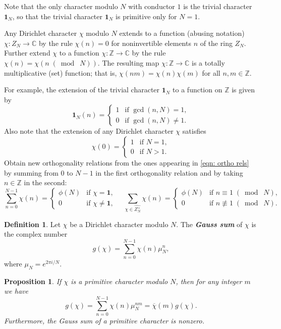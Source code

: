 \documentclass[10pt,leqno,twoside]{article}
\theoremstyle{plain}
\newtheorem{proposition}[lem]{Proposition}
\theoremstyle{definition}
\newtheorem{definition/}[lem]{Definition}
\newenvironment{definition}
  {\renewcommand{\qedsymbol}{\textdagger}%
   \pushQED{\qed}\begin{definition/}}
  {\popQED\end{definition/}}
\numberwithin{equation}{section}
\numberwithin{lem}{section}
\newcommand{\textib}[1]{\textbf{\textit{#1\index{#1}}}} %
\newcommand{\smod}[1]{\;(\bmod\; #1)}
\begin{document}
Note that the only character modulo $N$ with conductor $1$ is the trivial character $\mathbf 1_N$, so that the trivial character $\mathbf 1_N$ is primitive only for $N = 1$.

Any Dirichlet character $\chi$ modulo $N$ extends to a function (abusing notation) $\chi\colon Z_N\to\mathbb C$ by the rule $\chi(n) = 0$ for noninvertible elements $n$ of the ring $Z_N$. Further extend $\chi$ to a function $\chi\colon\mathbb Z\to\mathbb C$ by the rule $\chi(n) = \chi(n\smod N)$. The resulting map $\chi\colon \mathbb Z\to \mathbb C$ is a totally multiplicative (set) function; that is, $\chi(nm) = \chi(n)\chi(m)$ for all $n,m\in \mathbb Z$.

For example, the extension of the trivial character $\mathbf 1_N$ to a function on $\mathbb Z$ is given by
\[\mathbf 1_N(n) = \begin{cases}
    1 & \text{if $\gcd(n,N)=1$},\\
    0 & \text{if $\gcd(n,N)\neq1$}.
\end{cases}\]
Also note that the extension of any Dirichlet character $\chi$ satisfies 
\[\chi(0) = \begin{cases}
    1 & \text{if $N = 1$},\\
    0 & \text{if $N > 1$}.
\end{cases}\]
Obtain new orthogonality relations from the ones appearing in \cref{eqn: ortho rels} by summing from $0$ to $N-1$ in the first orthogonality relation and by taking $n\in\mathbb Z$ in the second:
\begin{equation}\label{eqn: new ortho rels}
    \sum_{n=0}^{N-1}\chi(n) = \begin{cases}
        \phi(N) & \text{if $\chi = \mathbf 1$},\\
        0 & \text{if $\chi\neq \mathbf 1$},
    \end{cases}\quad\sum_{\chi\in \widehat{Z_N^\times}}\chi(n) = \begin{cases}
        \phi(N) & \text{if $n\equiv 1\smod N$},\\
        0 & \text{if $n\not\equiv 1\smod N$}.
    \end{cases} 
\end{equation}
\begin{definition}
    Let $\chi$ be a Dirichlet character modulo $N$. The \textib{Gauss sum} of $\chi$ is the complex number
    \[g(\chi) = \sum_{n=0}^{N-1}\chi(n)\mu_N^n,\] where $\mu_N = e^{2\pi i/N}$.
\end{definition}
\begin{proposition}
    If $\chi$ is a primitive character modulo $N$, then for any integer $m$ we have 
    \[g(\chi) = \sum_{n=0}^{N-1}\chi(n)\mu_N^{nm} = \overline\chi(m)g(\chi).\] Furthermore, the Gauss sum of a primitive character is nonzero.
\end{proposition}
\end{document}
